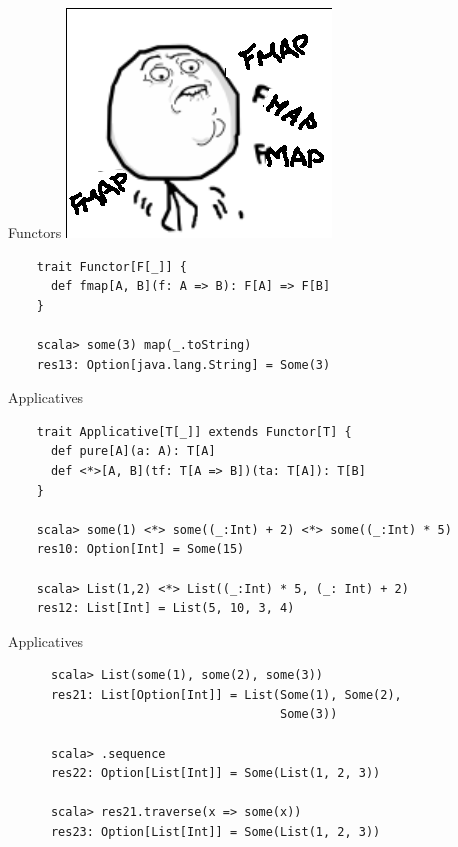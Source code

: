 \documentclass{beamer}
\begin{document}
\begin{frame}[fragile]{Functors}
  \includegraphics[scale=0.5]{img/fmapfmapfmap}
  \begin{verbatim}
    trait Functor[F[_]] {
      def fmap[A, B](f: A => B): F[A] => F[B]
    }

    scala> some(3) map(_.toString)
    res13: Option[java.lang.String] = Some(3)
  \end{verbatim}
\end{frame}

\begin{frame}[fragile]{Applicatives}
    \begin{verbatim}
    trait Applicative[T[_]] extends Functor[T] {
      def pure[A](a: A): T[A]
      def <*>[A, B](tf: T[A => B])(ta: T[A]): T[B]
    }

    scala> some(1) <*> some((_:Int) + 2) <*> some((_:Int) * 5)
    res10: Option[Int] = Some(15)

    scala> List(1,2) <*> List((_:Int) * 5, (_: Int) + 2)
    res12: List[Int] = List(5, 10, 3, 4)
  \end{verbatim}
\end{frame}

\begin{frame}[fragile]{Applicatives}
    \begin{verbatim}
      scala> List(some(1), some(2), some(3))
      res21: List[Option[Int]] = List(Some(1), Some(2),
                                      Some(3))

      scala> .sequence
      res22: Option[List[Int]] = Some(List(1, 2, 3))

      scala> res21.traverse(x => some(x))
      res23: Option[List[Int]] = Some(List(1, 2, 3))
  \end{verbatim}
\end{frame}
\end{document}

